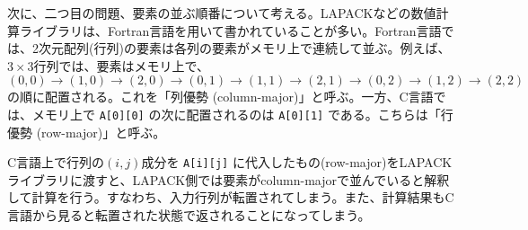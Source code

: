 次に、二つ目の問題、要素の並ぶ順番について考える。LAPACKなどの数値計算ライブラリは、Fortran言語を用いて書かれていることが多い。Fortran言語では、2次元配列(行列)の要素は各列の要素がメモリ上で連続して並ぶ。例えば、\(3 \times 3\)行列では、要素はメモリ上で、\((0,0) \rightarrow (1,0) \rightarrow (2,0) \rightarrow (0,1) \rightarrow (1,1) \rightarrow (2,1) \rightarrow (0,2) \rightarrow (1,2) \rightarrow (2,2)\) の順に配置される。これを「列優勢 (column-major)」と呼ぶ。一方、C言語では、メモリ上で \texttt{A[0][0]} の次に配置されるのは \texttt{A[0][1]} である。こちらは「行優勢 (row-major)」と呼ぶ。
\begin{figure}[H]
    \centering
\end{figure}
C言語上で行列の\((i,j)\)成分を \texttt{A[i][j]} に代入したもの(row-major)をLAPACKライブラリに渡すと、LAPACK側では要素がcolumn-majorで並んでいると解釈して計算を行う。すなわち、入力行列が転置されてしまう。また、計算結果もC言語から見ると転置された状態で返されることになってしまう。

